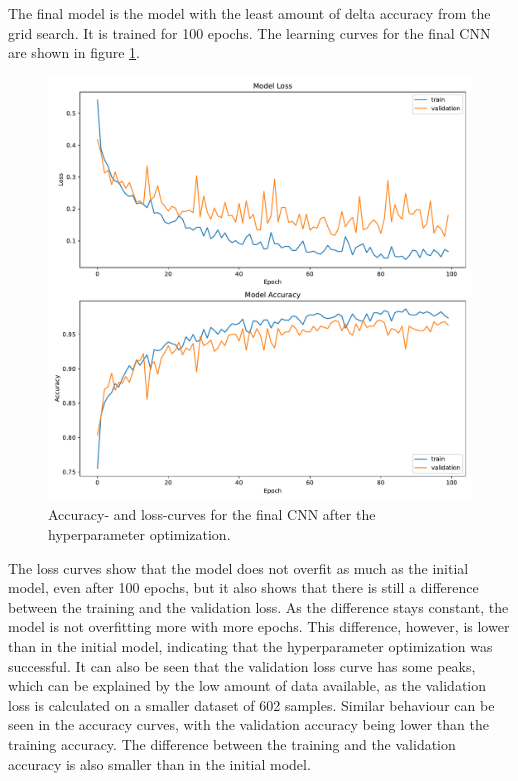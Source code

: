 The final model is the model with the least amount of delta accuracy from the grid search.
It is trained for 100 epochs. %
The learning curves for the final CNN are shown in figure \ref{fig:learningCurveFinal}.
\begin{figure}[H]
    \centering
    \includegraphics[width=.65\textwidth]{plots/history.pdf}
    \caption{Accuracy- and loss-curves for the final CNN after the hyperparameter optimization.}
    \label{fig:learningCurveFinal}
\end{figure}
The loss curves show that the model does not overfit as much as the initial model, even after 100 epochs, but it also shows that there is still a difference between the training and the validation loss.
As the difference stays constant, the model is not overfitting more with more epochs. 
This difference, however, is lower than in the initial model, indicating that the hyperparameter optimization was successful.
It can also be seen that the validation loss curve has some peaks, which can be explained by the low amount of data available, as the validation loss is calculated on a smaller dataset of 602 samples.
Similar behaviour can be seen in the accuracy curves, with the validation accuracy being lower than the training accuracy.
The difference between the training and the validation accuracy is also smaller than in the initial model.

